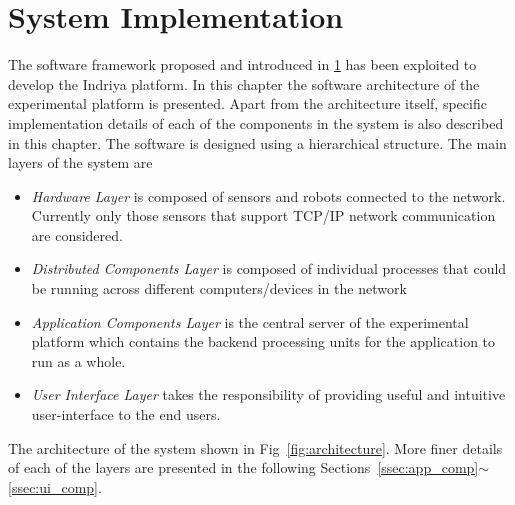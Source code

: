 
\chapter{System Implementation} %

\label{Chapter4} %

The software framework proposed and introduced in \ref{Chapter4} has been exploited to develop the Indriya platform. In this chapter the software architecture of the experimental platform is presented. Apart from the architecture itself, specific implementation details of each of the components in the system is also described in this chapter.  The software is designed using a hierarchical structure. The main layers of the system are
\begin{itemize}
\item \emph{Hardware Layer} is composed of sensors and robots connected to the network. Currently only those sensors that support TCP/IP network communication are considered.
\item \emph{Distributed Components Layer} is composed of individual processes that could be running across different computers/devices in the network
\item \emph{Application Components Layer} is the central server of the experimental platform which contains the backend processing units for the application to run as a whole.
\item \emph{User Interface Layer} takes the responsibility of providing useful and intuitive user-interface to the end users.
\end{itemize}
The architecture of the system shown in Fig~\ref{fig:architecture}. More finer details of each of the layers are presented in the following Sections~\ref{ssec:app_comp}$\sim$\ref{ssec:ui_comp}.

